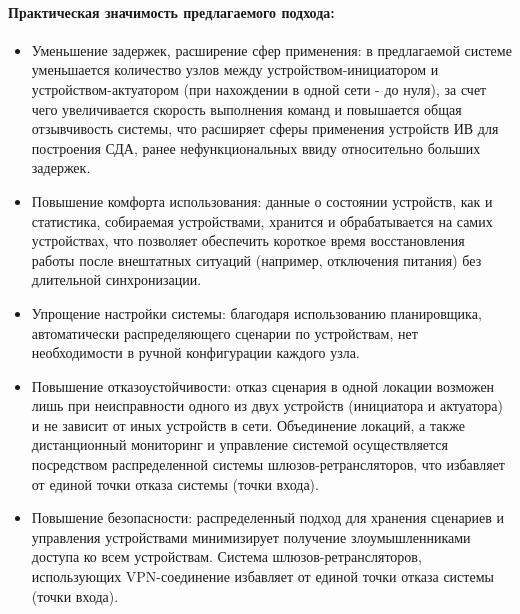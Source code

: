 \documentclass[a4paper,12pt]{article}
\begin{document}
\paragraph{Практическая значимость предлагаемого подхода:}
\begin{itemize}
    \item Уменьшение задержек, расширение сфер применения: в предлагаемой системе уменьшается количество узлов между устройством-инициатором и устройством-актуатором (при нахождении в одной сети - до нуля), за счет чего увеличивается скорость выполнения команд и повышается общая отзывчивость системы, что расширяет сферы применения устройств ИВ для построения СДА, ранее нефункциональных ввиду относительно больших задержек.
    \item Повышение комфорта использования: данные о состоянии устройств, как и статистика, собираемая устройствами, хранится и обрабатывается на самих устройствах, что позволяет обеспечить короткое время восстановления работы после внештатных ситуаций (например, отключения питания) без длительной синхронизации.
    \item Упрощение настройки системы: благодаря использованию планировщика, автоматически распределяющего сценарии по устройствам, нет необходимости в ручной конфигурации каждого узла.
    \item Повышение отказоустойчивости: отказ сценария в одной локации возможен лишь при неисправности одного из двух устройств (инициатора и актуатора) и не зависит от иных устройств в сети. Объединение локаций, а также дистанционный мониторинг и управление системой осуществляется посредством распределенной системы шлюзов-ретрансляторов, что избавляет от единой точки отказа системы (точки входа).
    \item Повышение безопасности: распределенный подход для хранения сценариев и управления устройствами минимизирует получение злоумышленниками доступа ко всем устройствам. Система шлюзов-ретрансляторов, использующих VPN-соединение избавляет от единой точки отказа системы (точки входа).

\end{itemize}
\end{document}
